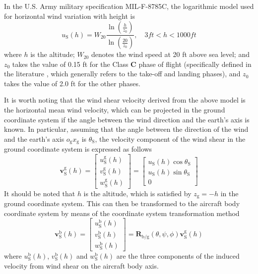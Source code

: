 In the U.S. Army military specification MIL-F-8785C\cite{military1980u}, the logarithmic model used for horizontal wind variation with height is
\begin{equation}\label{eq10}
u_{\mathrm{S}}(h)=W_{20} \frac{\ln \left(\frac{h}{z_0}\right)}{\ln \left(\frac{20}{z_0}\right)}, \quad 3 f t<h<1000 {ft}
\end{equation}
where $h$ is the altitude; $W_{20}$ denotes the wind speed at 20 ft above sea level; and $z_0$ takes the value of 0.15 ft for the Class $\mathbf{C}$ phase of flight (specifically defined in the literature \cite{military1980u}, which generally refers to the take-off and landing phases), and $z_{0}$ takes the value of 2.0 ft for the other phases.

It is worth noting that the wind shear velocity derived from the above model is the horizontal mean wind velocity, which can be projected in the ground coordinate system if the angle between the wind direction and the earth's axis is known. In particular, assuming that the angle between the direction of the wind and the earth's axis $o_{\mathrm{g}}x_{\mathrm{g}}$ is $\theta_{\mathrm{S}}$, the velocity component of the wind shear in the ground coordinate system is expressed as follows
\begin{equation}\label{eq11}
\mathbf{v}_{\mathrm{S}}^\mathrm{g}(h)=\left[\begin{array}{c}
u_{\mathrm{S}}^\mathrm{g}(h) \\
v_{\mathrm{S}}^\mathrm{g}(h) \\
w_{\mathrm{S}}^\mathrm{g}(h)
\end{array}\right]=\left[\begin{array}{c}
u_{\mathrm{S}}(h) \cos \theta_{\mathrm{S}} \\
u_{\mathrm{S}}(h) \sin \theta_{\mathrm{S}} \\
0
\end{array}\right]
\end{equation}
It should be noted that $h$ is the altitude, which is satisfied by $z_\mathrm{g}=-h$ in the ground coordinate system. This can then be transformed to the aircraft body coordinate system by means of the coordinate system transformation method
\begin{equation}\label{eq12}
\mathbf{v}_{\mathrm{S}}^{\mathrm{b}}(h)=\left[\begin{array}{c}
u_{\mathrm{S}}^{\mathrm{b}}(h) \\
v_{\mathrm{S}}^{\mathrm{b}}(h) \\
w_{\mathrm{S}}^{\mathrm{b}}(h)
\end{array}\right]=\mathbf{R}_{\mathrm{b} / \mathrm{g}}(\theta, \psi, \phi) \mathbf{v}_{\mathrm{S}}^{\mathrm{g}}(h)
\end{equation}
where $u_{\mathrm{S}}^{\mathrm{b}}(h)$, $v_{\mathrm{S}}^{\mathrm{b}}(h)$ and $w_{\mathrm{S}}^{\mathrm{b}}(h)$ are the three components of the induced velocity from wind shear on the aircraft body axis.

